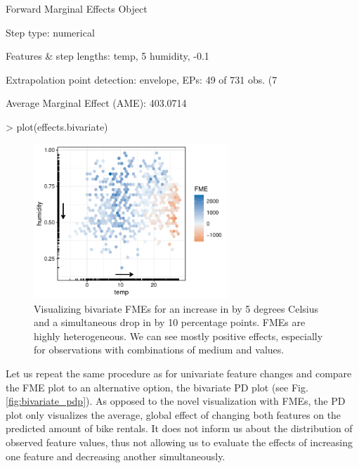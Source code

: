 \begin{example}
Forward Marginal Effects Object

Step type:
  numerical

Features & step lengths:
  temp, 5
  humidity, -0.1

Extrapolation point detection:
  envelope, EPs: 49 of 731 obs. (7 %

Average Marginal Effect (AME):
  403.0714
\end{example}

\begin{example}
> plot(effects.bivariate)
\end{example}
\begin{figure}[H]
    \centering
    \includegraphics[width = 0.65\textwidth]{figures/pbiv.pdf}
    \caption{Visualizing bivariate FMEs for an increase in  by 5 degrees Celsius and a simultaneous drop in  by 10 percentage points. FMEs are highly heterogeneous. We can see mostly positive effects, especially for observations with combinations of medium  and  values.}
    \label{fig:bivariate_fme}
\end{figure}
Let us repeat the same procedure as for univariate feature changes and compare the FME plot to an alternative option, the bivariate PD plot (see Fig. \ref{fig:bivariate_pdp}). 
As opposed to the novel visualization with FMEs, the PD plot only visualizes the average, global effect of changing both features on the predicted amount of bike rentals. It does not inform us about the distribution of observed feature values, thus not allowing us to evaluate the effects of increasing one feature and decreasing another simultaneously. 


